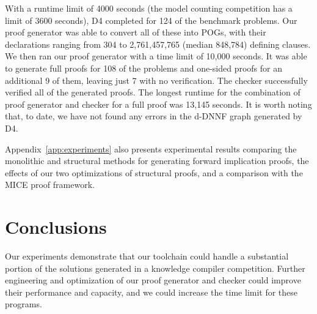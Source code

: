 \documentclass[letterpaper,USenglish,cleveref, autoref, thm-restate]{lipics-v2021}
\newcommand{\pand}{\mathbin{\land^{\sf p}}}
\newcommand{\dependencyset}{{\cal D}}
\newcommand{\modelset}{{\cal M}}
\newcommand{\makenode}[1]{\mathbf{#1}}
\newcommand{\nodeu}{\makenode{u}}
\newcommand{\progname}[1]{\textsc{#1}}
\newcommand{\dfour}{\progname{D4}}
\begin{document}
With a runtime limit of 4000 seconds (the model counting competition
has a limit of 3600 seconds), \dfour{} completed for 124 of the
benchmark problems.  Our proof generator was able to convert all of
these into POGs, with their declarations ranging from 304 to
2,761,457,765 (median 848,784) defining clauses.
We then ran our proof generator with a time limit of 10,000 seconds.
It was able to generate full proofs for 108 of the problems and
one-sided proofs for an additional 9 of them, leaving just 7 with no
verification.  The checker successfully verified all of the generated
proofs.  The longest runtime for the combination of proof generator
and checker for a full proof was 13,145 seconds.
It is worth noting that, to date, we have not found
any errors in the d-DNNF graph generated by \dfour{}.  

Appendix~\ref{app:experiments} also presents experimental results
comparing the monolithic and structural methods for generating forward
implication proofs, the effects of our two optimizations of structural
proofs, and a comparison with the MICE proof framework.


\section{Conclusions}
\label{sect:future}

Our experiments demonstrate that our toolchain could handle a
substantial portion of the solutions generated in a knowledge compiler
competition.  Further engineering and optimization of our proof
generator and checker could improve their performance and capacity,
and we could increase the time limit for these programs.




\end{document}
